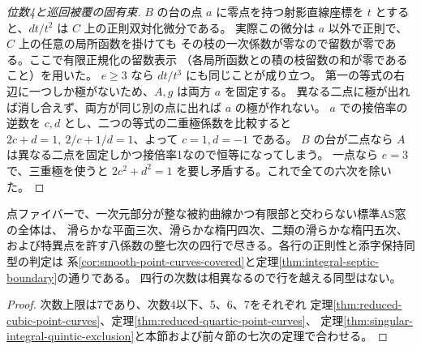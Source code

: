 \begin{proof}[位数4と巡回被覆の固有束]
$B$ の台の点 $a$ に零点を持つ射影直線座標を $t$ とすると、$dt/t^2$ は $C$ 上の正則双対化微分である。
実際この微分は $a$ 以外で正則で、$C$ 上の任意の局所函数を掛けても
その枝の一次係数が零なので留数が零である。ここで有限正規化の留数表示
（各局所函数との積の枝留数の和が零であること）を用いた。
$e\ge3$ なら $dt/t^3$ にも同じことが成り立つ。
第一の等式の右辺に一つしか極がないため、$A,g$ は両方 $a$ を固定する。
異なる二点に極が出れば消し合えず、両方が同じ別の点に出れば $a$ の極が作れない。
$a$ での接倍率の逆数を $c,d$ とし、二つの等式の二重極係数を比較すると
$2c+d=1,\ 2/c+1/d=1$、よって $c=1,d=-1$ である。
$B$ の台が二点なら $A$ は異なる二点を固定しかつ接倍率1なので恒等になってしまう。
一点なら $e=3$ で、三重極を使うと $2c^2+d^2=1$ を要し矛盾する。これで全ての六次を除いた。
\end{proof}

\begin{corollary}\label{cor:integral-point-curves-covered}
点ファイバーで、一次元部分が整な被約曲線かつ有限部と交わらない標準AS窓の全体は、
滑らかな平面三次、滑らかな楕円四次、二類の滑らかな楕円五次、
および特異点を許す八係数の整七次の四行で尽きる。各行の正則性と添字保持同型の判定は
系\ref{cor:smooth-point-curves-covered}と定理\ref{thm:integral-septic-boundary}の通りである。
四行の次数は相異なるので行を越える同型はない。
\end{corollary}
\begin{proof}
次数上限は7であり、次数4以下、5、6、7をそれぞれ
定理\ref{thm:reduced-cubic-point-curves}、定理\ref{thm:reduced-quartic-point-curves}、
定理\ref{thm:singular-integral-quintic-exclusion}と本節および前々節の七次の定理で合わせる。
\end{proof}
